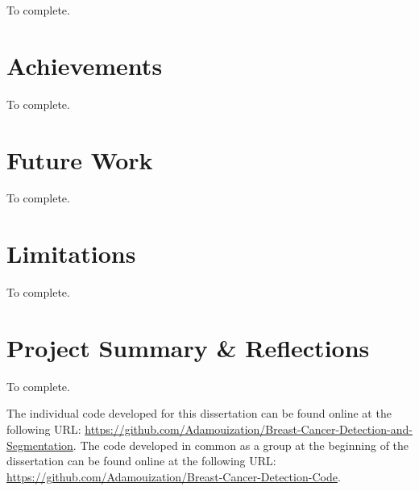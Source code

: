 To complete.


\section{Achievements}

To complete.
    

\section{Future Work}

To complete.


\section{Limitations}
\label{sec:conclusions-limitations}

To complete.
    

\section{Project Summary \& Reflections}

To complete.

The individual code developed for this dissertation can be found online at the following URL: \url{https://github.com/Adamouization/Breast-Cancer-Detection-and-Segmentation}. The code developed in common as a group at the beginning of the dissertation can be found online at the following URL: \url{https://github.com/Adamouization/Breast-Cancer-Detection-Code}.